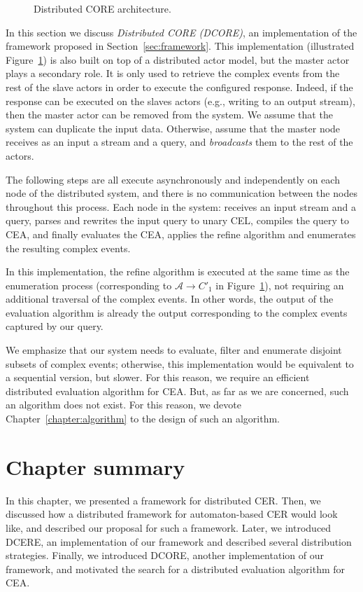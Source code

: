 \begin{figure}[t]
  \centering
  \caption{Distributed CORE architecture.}
  \label{fig:dcore}
\end{figure}

In this section we discuss \emph{Distributed CORE (DCORE)}, an implementation of the framework proposed in Section~\ref{sec:framework}. This implementation (illustrated Figure~\ref{fig:dcore}) is also built on top of a distributed actor model, but the master actor plays a secondary role. It is only used to retrieve the complex events from the rest of the slave actors in order to execute the configured response. Indeed, if the response can be executed on the slaves actors (e.g., writing to an output stream), then the master actor can be removed from the system. We assume that the system can duplicate the input data. Otherwise, assume that the master node receives as an input a stream and a query, and \emph{broadcasts} them to the rest of the actors.

The following steps are all execute asynchronously and independently on each node of the distributed system, and there is no communication between the nodes throughout this process. Each node in the system: receives an input stream and a query, parses and rewrites the input query to unary CEL, compiles the query to CEA, and finally evaluates the CEA, applies the refine algorithm and enumerates the resulting complex events.

In this implementation, the refine algorithm is executed at the same time as the enumeration process (corresponding to $\mathcal{A} \to C'_{1}$ in Figure~\ref{fig:dcore}), not requiring an additional traversal of the complex events. In other words, the output of the evaluation algorithm is already the output corresponding to the complex events captured by our query.

We emphasize that our system needs to evaluate, filter and enumerate disjoint subsets of complex events; otherwise, this implementation would be equivalent to a sequential version, but slower. For this reason, we require an efficient distributed evaluation algorithm for CEA. But, as far as we are concerned, such an algorithm does not exist. For this reason, we devote Chapter~\ref{chapter:algorithm} to the design of such an algorithm.

\section{Chapter summary}

In this chapter, we presented a framework for distributed CER. Then, we discussed how a distributed framework for automaton-based CER would look like, and described our proposal for such a framework. Later, we introduced DCERE, an implementation of our framework and described several distribution strategies. Finally, we introduced DCORE, another implementation of our framework, and motivated the search for a distributed evaluation algorithm for CEA.
